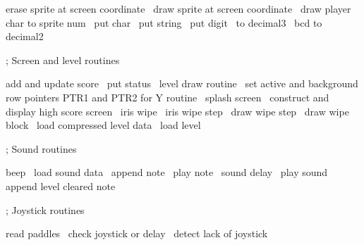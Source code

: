 \documentclass[10pt]{report}%
\begin{document}
    \LA{}erase sprite at screen coordinate~{\nwtagstyle{}}\RA{}
    \LA{}draw sprite at screen coordinate~{\nwtagstyle{}}\RA{}
    \LA{}draw player~{\nwtagstyle{}}\RA{}
    \LA{}char to sprite num~{\nwtagstyle{}}\RA{}
    \LA{}put char~{\nwtagstyle{}}\RA{}
    \LA{}put string~{\nwtagstyle{}}\RA{}
    \LA{}put digit~{\nwtagstyle{}}\RA{}
    \LA{}to decimal3~{\nwtagstyle{}}\RA{}
    \LA{}bcd to decimal2~{\nwtagstyle{}}\RA{}

    ; Screen and level routines

    \LA{}add and update score~{\nwtagstyle{}}\RA{}
    \LA{}put status~{\nwtagstyle{}}\RA{}
    \LA{}level draw routine~{\nwtagstyle{}}\RA{}
    \LA{}set active and background row pointers \code{}PTR1\edoc{} and \code{}PTR2\edoc{} for \code{}Y\edoc{} routine~{\nwtagstyle{}}\RA{}
    \LA{}splash screen~{\nwtagstyle{}}\RA{}
    \LA{}construct and display high score screen~{\nwtagstyle{}}\RA{}
    \LA{}iris wipe~{\nwtagstyle{}}\RA{}
    \LA{}iris wipe step~{\nwtagstyle{}}\RA{}
    \LA{}draw wipe step~{\nwtagstyle{}}\RA{}
    \LA{}draw wipe block~{\nwtagstyle{}}\RA{}
    \LA{}load compressed level data~{\nwtagstyle{}}\RA{}
    \LA{}load level~{\nwtagstyle{}}\RA{}

    ; Sound routines

    \LA{}beep~{\nwtagstyle{}}\RA{}
    \LA{}load sound data~{\nwtagstyle{}}\RA{}
    \LA{}append note~{\nwtagstyle{}}\RA{}
    \LA{}play note~{\nwtagstyle{}}\RA{}
    \LA{}sound delay~{\nwtagstyle{}}\RA{}
    \LA{}play sound~{\nwtagstyle{}}\RA{}
    \LA{}append level cleared note~{\nwtagstyle{}}\RA{}

    ; Joystick routines

    \LA{}read paddles~{\nwtagstyle{}}\RA{}
    \LA{}check joystick or delay~{\nwtagstyle{}}\RA{}
    \LA{}detect lack of joystick~{\nwtagstyle{}}\RA{}
\end{document}
